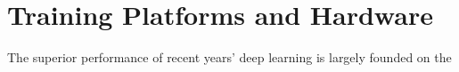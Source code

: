 \section{Training Platforms and Hardware}
The superior performance of recent years' deep learning is largely founded on the 